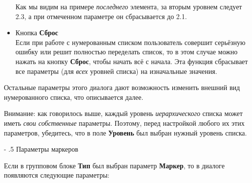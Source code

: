 \documentclass[a4paper,10pt]{article}
\makeatletter
\renewcommand\paragraph{%
   \@startsection{paragraph}{4}{0mm}%
      {-\baselineskip}%
      {.5\baselineskip}%
      {\normalfont\normalsize\bfseries}}
\makeatother
\begin{document}
\begin{itemize}
 Как мы видим на примере \textit{последнего} элемента, за вторым уровнем следует 2.3, а при отмеченном параметре он сбрасывается до 2.1.
 \item Кнопка \textbf{Сброс}\\
 Если при работе с нумерованным списком пользователь совершит серьёзную ошибку или решит полностью переделать список, то в этом случае можно нажать на кнопку \textbf{Сброс}, чтобы начать всё с начала. Эта функция сбрасывает все параметры (для \textit{всех} уровней списка) на изначальные значения.
\end{itemize}

Остальные параметры этого диалога дают возможность изменить внешний вид нумерованного списка, что описывается далее.

Внимание: как говорилось выше, каждый уровень \textit{иерархического} списка может иметь \textit{свои собственные} параметры. Поэтому, перед настройкой любого их этих параметров, убедитесь, что в поле \textbf{Уровень} был выбран нужный уровень списка.

\paragraph{Параметры маркеров}

Если в групповом блоке \textbf{Тип} был выбран параметр \textbf{Маркер}, то в диалоге появляются следующие параметры:
\end{document}
